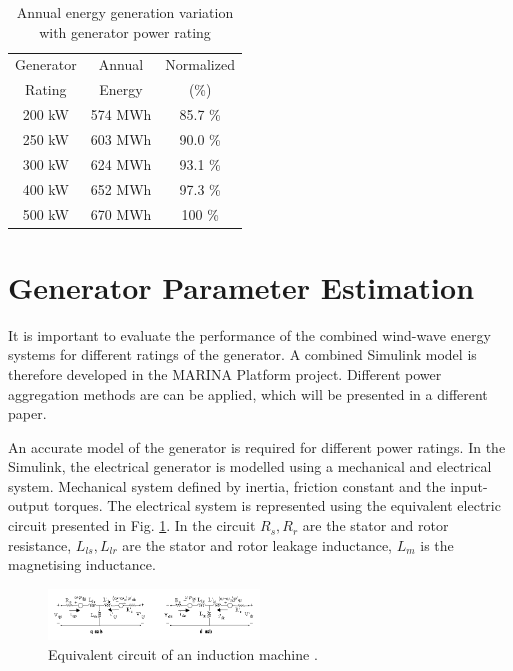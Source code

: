 \documentclass[twocolumn]{article}
\begin{document}
  \begin{table}
    \centering
    \begin{tabular}{ccc}
     Generator & Annual & Normalized \\
     Rating & Energy & (\%) \\
    \hline
  200 kW & 574 MWh & 85.7 \% \\
  250 kW & 603 MWh & 90.0 \% \\
  300 kW & 624 MWh & 93.1 \% \\
  400 kW & 652 MWh & 97.3 \% \\
  500 kW & 670 MWh & 100 \%\\
  \hline
    \end{tabular}
    \caption{Annual energy generation variation with generator power rating}
    \label{generator_rating_table}
  \end{table}
  
\section{Generator Parameter Estimation}

It is important to evaluate the performance of the combined wind-wave energy systems for different ratings of the generator. A combined Simulink model is therefore developed in the MARINA Platform project. Different power aggregation methods are can be applied, which will be presented in a different paper.

An accurate model of the generator is required for different power ratings. In the Simulink, the electrical generator is modelled using a mechanical and electrical system. Mechanical system defined by inertia, friction constant and the input-output torques. The electrical system is represented using the equivalent electric circuit presented in Fig. \ref{equivalent_circuit}. In the circuit $R_s, R_r$ are the stator and rotor resistance, $L_{ls}, L_{lr}$ are the stator and rotor leakage inductance, $L_m$ is the magnetising inductance.


  \begin{figure}
    \centering
    \includegraphics[width=0.5\textwidth]{scig_schematic}
    \caption{Equivalent circuit of an induction machine \cite{Matlab}.} 
    \label{equivalent_circuit}
  \end{figure}
  
\end{document}
